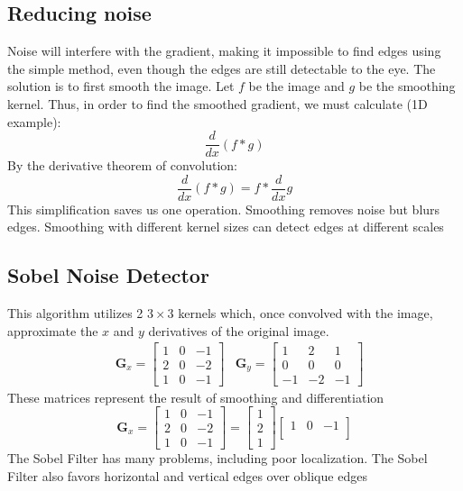 \documentclass{article}
\begin{document}
\subsection{Reducing noise}
Noise will interfere with the gradient, making it impossible to find edges using the simple method, even though the edges are still detectable to the eye.  The solution is to first smooth the image.
\newline
Let $f$ be the image and $g$ be the smoothing kernel.  Thus, in order to find the smoothed gradient, we must calculate (1D example):
\[
\frac{d}{dx}(f*g)
\]
By the derivative theorem of convolution:
\[
\frac{d}{dx}(f*g) = f*\frac{d}{dx}g
\]
This simplification saves us one operation.  Smoothing removes noise but blurs edges.  Smoothing with different kernel sizes can detect edges at different scales
\subsection{Sobel Noise Detector}
This algorithm utilizes 2 $3\times3$ kernels which, once convolved with the image, approximate the $x$ and $y$ derivatives of the original image.
\begin{align*}
&\mathbf{G}_x = \begin{bmatrix}%
    1 & 0 & -1\\
    2 & 0 & -2\\
    1 & 0 & -1
    \end{bmatrix}
    &\mathbf{G}_y = \begin{bmatrix}%
    1 & 2 & 1\\
    0 & 0 & 0\\
    -1 & -2 & -1
    \end{bmatrix}
\end{align*}
These matrices represent the result of smoothing and differentiation
\[
\mathbf{G}_x = \begin{bmatrix}%
    1 & 0 & -1\\
    2 & 0 & -2\\
    1 & 0 & -1
    \end{bmatrix} = \begin{bmatrix}%
    1\\
    2\\
    1
    \end{bmatrix}\begin{bmatrix}%
    1 & 0 & -1\\
    \end{bmatrix}
\]
The Sobel Filter has many problems, including poor localization.  The Sobel Filter also favors horizontal and vertical edges over oblique edges
\end{document}
